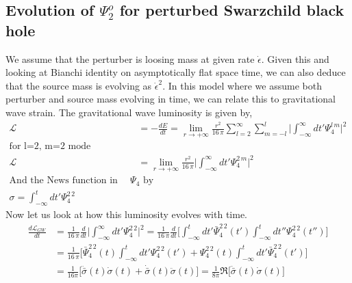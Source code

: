 \documentclass[prd,preprintnumbers,onecolumn,eqsecnum,floatfix,letter]{revtex4}
\begin{document}
\subsection{Evolution of $\Psi^{o}_{2}$ for perturbed Swarzchild black hole }
We assume that the perturber is loosing mass at given rate $\dot{\epsilon}$. Given this and looking at Bianchi identity on asymptotically flat space time, we can also deduce that the source mass is evolving as $\dot{\epsilon}^2$. In this model where we assume both perturber and source mass evolving in time, we can relate this to gravitational wave strain. The gravitational wave luminosity is given by,
\begin{align}
	\mathcal{L} &= -\frac{dE}{dt} = \lim_{r \to +\infty} \frac{r^2}{16\,\pi}\sum_{l=2}^{\infty}\sum_{m=-l}^{l}\Big|\int_{-\infty}^{\infty}dt'\Psi_{4}^{l\,m}\Big|^2 \nonumber \\
	\text{for l=2, m=2 mode}\\
	\mathcal{L} &=  \lim_{r \to +\infty} \frac{r^2}{16\,\pi}\Big|\int_{-\infty}^{\infty}dt'\Psi_{4}^{2\,m}\Big|^2 \\
	\text{And the News function in related to $\Psi_4$ by} \nonumber\\
\sigma = \int_{-\infty}^{t}dt'\Psi_{4}^{2\,2} 
\end{align}
 Now let us look at how this luminosity evolves with time.
 \begin{align}
 	\frac{d\mathcal{L}_{GW}}{dt} &=  \frac{1}{16\,\pi}\frac{d}{dt}\Big|\int_{-\infty}^{\infty}dt'\Psi_{4}^{2\,2}\Big|^2 = \frac{1}{16\,\pi}\frac{d}{dt}\Big[\int_{-\infty}^{t}dt'\bar{\Psi}_{4}^{2\,2}(t')\int_{-\infty}^{t}dt''\Psi_{4}^{2\,2}(t'')\Big]\\
 	&=\frac{1}{16\,\pi}\Big[\bar{\Psi}_{4}^{2\,2}(t)\int_{-\infty}^{t}dt'\Psi_{4}^{2\,2}(t') + \Psi_{4}^{2\,2}(t)\int_{-\infty}^{t}dt'\bar{\Psi}_{4}^{2\,2}(t')\Big] \nonumber\\
 	&=\frac{1}{16\pi}\Big[\ddot{\bar{\sigma}}(t)\dot{\sigma}(t) + \dot{\bar{\sigma}}(t)\ddot{\sigma}(t)\Big] = \frac{1}{8\pi}\Re\Big[\ddot{\bar{\sigma}}(t)\dot{\sigma}(t)\Big]
 \end{align}
 
\end{document}
